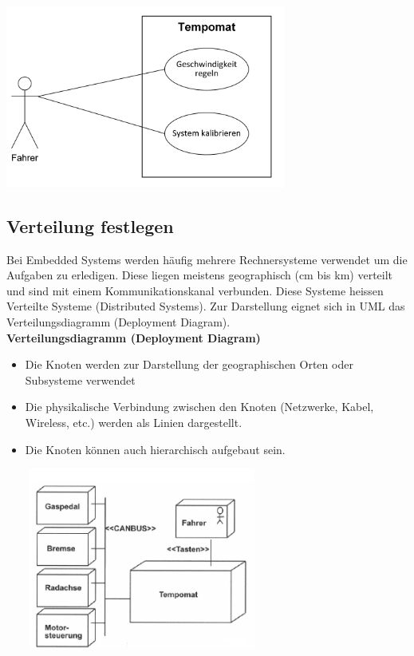 \includegraphics[height=6cm]{images/Modellierung/Systemgrenze}

\subsection{Verteilung festlegen}
Bei Embedded Systems werden häufig mehrere Rechnersysteme verwendet um die Aufgaben zu erledigen. Diese liegen meistens 
geographisch (cm bis km) verteilt und sind mit einem Kommunikationskanal verbunden. Diese Systeme heissen Verteilte Systeme (Distributed Systems). Zur Darstellung eignet sich in UML das Verteilungsdiagramm (Deployment Diagram).\\

\textbf{Verteilungsdiagramm (Deployment Diagram)}
\begin{itemize}
	\item Die Knoten werden zur Darstellung der geographischen Orten oder Subsysteme verwendet
	\item Die physikalische Verbindung zwischen den Knoten (Netzwerke, Kabel, Wireless, etc.) werden als Linien dargestellt.
	\item Die Knoten können auch hierarchisch aufgebaut sein.
\end{itemize}

\includegraphics[height=6cm, width = 9cm,]{images/Modellierung/Verteilungsdiagramm}


